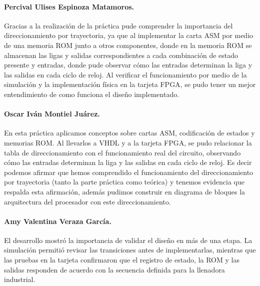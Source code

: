 \documentclass[letterpaper,12pt]{article}
\begin{document}
\paragraph{Percival Ulises Espinoza Matamoros.} Gracias a la realización de la práctica pude comprender la importancia del direccionamiento por trayectoria, ya que al implementar la carta ASM por medio de una memoria ROM junto a otros componentes, donde en la memoria ROM se almacenan las ligas y salidas correspondientes a cada combinación de estado presente y entradas, donde pude observar cómo las entradas determinan la liga y las salidas en cada ciclo de reloj. Al verificar el funcionamiento por medio de la simulación y la implementación física en la tarjeta FPGA, se pudo tener un mejor entendimiento de como funciona el diseño implementado.

\paragraph{Oscar Iván Montiel Juárez.} En esta práctica aplicamos conceptos sobre cartas ASM, codificación de estados y memorias ROM. Al llevarlos a VHDL y a la tarjeta FPGA, se pudo relacionar la tabla de direccionamiento con el funcionamiento real del circuito, observando cómo las entradas determinan la liga y las salidas en cada ciclo de reloj. Es decir podemos afirmar que hemos comprendido el funcionamiento del direccionamiento por trayectoria (tanto la parte práctica como teórica) y tenemos evidencia que respalda esta afirmación, además pudimos construir en diagrama de bloques la arquitectura del procesador con este direccionamiento.

\paragraph{Amy Valentina Veraza García.} El desarrollo mostró la importancia de validar el diseño en más de una etapa. La simulación permitió revisar las transiciones antes de implementarlas, mientras que las pruebas en la tarjeta confirmaron que el registro de estado, la ROM y las salidas responden de acuerdo con la secuencia definida para la llenadora industrial.
\end{document}
